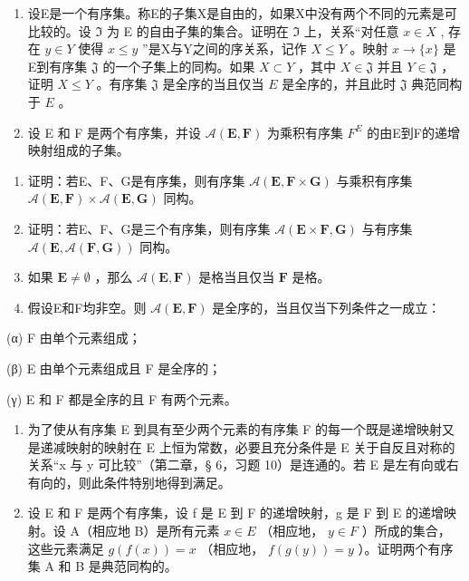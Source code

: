 \begin{enumerate}
\def\labelenumi{\arabic{enumi}.}
\setcounter{enumi}{4}
\item
  设E是一个有序集。称E的子集X是自由的，如果X中没有两个不同的元素是可比较的。设 \(\Im\) 为 E 的自由子集的集合。证明在 \(\Im\) 上，关系“对任意 \(x \in X\) , 存在 \(y \in Y\) 使得 \(x \leqslant y\) ”是X与Y之间的序关系，记作 \(X \leqslant Y\) 。映射 \(x \to \{x\}\) 是E到有序集 \(\mathfrak{J}\) 的一个子集上的同构。如果 \(X \subset Y\) ，其中 \(X \in \mathfrak{J}\) 并且 \(Y \in \mathfrak{J}\) ，证明 \(X \leqslant Y\) 。有序集 \(\mathfrak{J}\) 是全序的当且仅当 \(E\) 是全序的，并且此时 \(\mathfrak{J}\) 典范同构于 \(E\) 。
\item
  设 E 和 F 是两个有序集，并设 \(\mathcal{A}(\mathbf{E},\mathbf{F})\) 为乘积有序集 \(F^{E}\) 的由E到F的递增映射组成的子集。
\end{enumerate}

\begin{enumerate}
\def\labelenumi{(\alph{enumi})}
\item
  证明：若E、F、G是有序集，则有序集 \(\mathcal{A}(\mathbf{E}, \mathbf{F} \times \mathbf{G})\) 与乘积有序集 \(\mathcal{A}(\mathbf{E}, \mathbf{F}) \times \mathcal{A}(\mathbf{E}, \mathbf{G})\) 同构。
\item
  证明：若E、F、G是三个有序集，则有序集 \(\mathcal{A}(\mathbf{E} \times \mathbf{F}, \mathbf{G})\) 与有序集 \(\mathcal{A}(\mathbf{E}, \mathcal{A}(\mathbf{F}, \mathbf{G}))\) 同构。
\item
  如果 \(\mathbf{E} \neq \emptyset\) ，那么 \(\mathcal{A}(\mathbf{E}, \mathbf{F})\) 是格当且仅当 \(\mathbf{F}\) 是格。
\item
  假设E和F均非空。则 \(\mathcal{A}(\mathbf{E}, \mathbf{F})\) 是全序的，当且仅当下列条件之一成立：
\end{enumerate}

(α) F 由单个元素组成；

(β) E 由单个元素组成且 F 是全序的；

(γ) E 和 F 都是全序的且 F 有两个元素。

\begin{enumerate}
\def\labelenumi{\arabic{enumi}.}
\setcounter{enumi}{6}
\item
  为了使从有序集 E 到具有至少两个元素的有序集 F 的每一个既是递增映射又是递减映射的映射在 E 上恒为常数，必要且充分条件是 E 关于自反且对称的关系“x 与 y 可比较”（第二章，§ 6，习题 10）是连通的。若 E 是左有向或右有向的，则此条件特别地得到满足。
\item
  设 E 和 F 是两个有序集，设 f 是 E 到 F 的递增映射，g 是 F 到 E 的递增映射。设 A（相应地 B）是所有元素 \(x \in E\) （相应地， \(y \in F\) ）所成的集合，这些元素满足 \(g(f(x)) = x\) （相应地， \(f(g(y)) = y\) ）。证明两个有序集 A 和 B 是典范同构的。
\end{enumerate}

